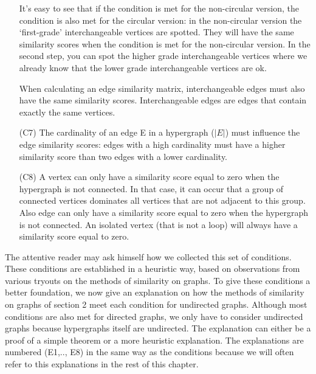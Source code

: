 \documentclass[a4paper,11pt]{report}
\begin{document}
\begin{itemize}
It's easy to see that if the condition is met for the non-circular version, the 
condition is also met for the circular version: in the non-circular version the 
`first-grade' interchangeable vertices are spotted. They will have the same 
similarity scores when the condition is met for the non-circular version. In the 
second step, you can spot the higher grade interchangeable vertices where we 
already know that the lower grade interchangeable vertices are ok.
  
 When calculating 
  an edge similarity matrix, interchangeable edges must also have the same similarity 
  scores. Interchangeable edges are edges that contain exactly the same 
  vertices.

  \item[(C7)] The cardinality of an edge E in a hypergraph ($|E|$) must 
  influence the edge similarity scores: edges with a high cardinality must have a higher similarity score than two edges with a lower cardinality.
      \item[(C8)] A vertex can only have a similarity score equal to zero when the hypergraph is not connected. In that case, 
  it can occur that a group of connected vertices dominates all vertices that are not adjacent to this group. 
  Also edge can only have a similarity score equal to zero when the hypergraph is not connected. 
  An isolated vertex (that is not a loop) will always have a similarity score equal 
  to zero. 
  \end{itemize}
The attentive reader may ask himself how we collected this set of conditions. 
These conditions are established in a heuristic way, based on observations from 
various tryouts on the methods of similarity on graphs. To give these conditions 
a better foundation, we now give an explanation on how the methods of similarity on graphs of
section 2 meet each condition for undirected graphs. Although most conditions are also met for
directed graphs,  we only have to consider undirected graphs
because hypergraphs itself are undirected. The explanation can either be a proof of a simple 
theorem or a more heuristic explanation. The explanations are numbered (E1,.., E8) 
in the same way as the conditions because we will often refer to this 
explanations in the rest of this chapter. 
\end{document}
